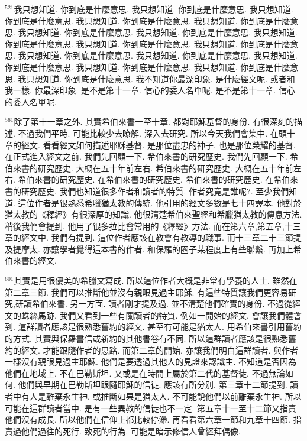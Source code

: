 \documentclass{book}
\begin{document}
$^{521}$我只想知道.
你到底是什麼意思.
我只想知道.
你到底是什麼意思.
我只想知道.
你到底是什麼意思.
我只想知道.
你到底是什麼意思.
我只想知道.
你到底是什麼意思.
我只想知道.
你到底是什麼意思.
我只想知道.
你到底是什麼意思.
我只想知道.
你到底是什麼意思.
我只想知道.
你到底是什麼意思.
我只想知道.
你到底是什麼意思.
我只想知道.
你到底是什麼意思.
我只想知道.
你到底是什麼意思.
我只想知道.
你到底是什麼意思.
我只想知道.
你到底是什麼意思.
我只想知道.
你到底是什麼意思.
我只想知道.
你到底是什麼意思.
我不知道你最深印象.
是什麼經文呢.
或者和我一樣.
你最深印象.
是不是第十一章.
信心的委人名單呢.
是不是第十一章.
信心的委人名單呢.

$^{561}$除了第十一章之外.
其實希伯來書一至十章.
都對耶穌基督的身份.
有很深刻的描述.
不過我們平時.
可能比較少去瞭解.
深入去研究.
所以今天我們會集中.
在頭十章的經文.
看看經文如何描述耶穌基督.
是那位盡忠的神子.
也是那位榮耀的基督.
在正式進入經文之前.
我們先回顧一下.
希伯來書的研究歷史.
我們先回顧一下.
希伯來書的研究歷史.
大概在五十年前左右.
希伯來書的研究歷史.
大概在五十年前左右.
希伯來書的研究歷史.
在希伯來書的研究歷史.
希伯來書的研究歷史.
在希伯來書的研究歷史.
我們也知道很多作者和讀者的特質.
作者究竟是誰呢?.
至少我們知道.
這位作者是很熟悉希臘猶太教的傳統.
他引用的經文多數是七十四譯本.
他對於猶太教的《釋經》有很深厚的知識.
他很清楚希伯來聖經和希臘猶太教的傳息方法.
稍後我們會提到.
他用了很多拉比會常用的《釋經》方法.
而在第六章,第五章,十三章的經文中.
我們有提到.
這位作者應該在教會有教導的職事.
而十三章二十三節提及提摩太.
亦讓學者覺得這本書的作者.
和保羅的圈子某程度上有些聯繫.
再加上希伯來書的經文.

$^{601}$其實是用很優美的希臘文寫成.
所以這位作者大概是非常有學養的人士.
雖然在第二章三節.
我們可以推斷他並沒有親眼見過主耶穌.
有這些特質讓我們更容易研究,研讀希伯來書.
另一方面.
讀者剛才提及過.
並不清楚他們確實的身份.
不過從經文的蛛絲馬跡.
我們又看到一些有關讀者的特質.
例如一開始的經文.
會讓我們體會到.
這群讀者應該是很熟悉舊約的經文.
甚至有可能是猶太人.
用希伯來書引用舊約的方式.
其實與保羅書信或新約的其他書卷有不同.
所以這群讀者應該是很熟悉舊約的經文.
才能跟隨作者的思路.
而第二章的開始.
亦讓我們明白這群讀者.
與作者一樣沒有親眼見過主耶穌.
他們是要透過其他人的見證來認識主.
不知道是否因為他們在地域上.
不在巴勒斯坦.
又或是在時間上屬於第二代的基督徒.
不過無論如何.
他們與早期在巴勒斯坦跟隨耶穌的信徒.
應該有所分別.
第三章十二節提到.
讀者中有人是離棄永生神.
或推斷如果是猶太人.
不可能說他們以前離棄永生神.
所以可能在這群讀者當中.
是有一些異教的信徒也不一定.
第五章十一至十二節又指責他們沒有成長.
所以他們在信仰上都比較停滯.
再看看第六章一節和九章十四節.
指責過他們過往的死行.
致死的行為.
可能是暗示修信人曾經拜偶像.
\end{document}

